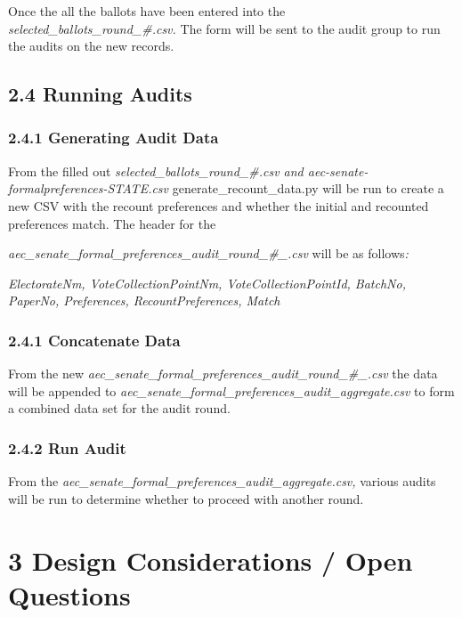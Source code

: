 \documentclass[]{article}
\begin{document}
Once the all the ballots have been entered into the
\emph{selected\_ballots\_round\_\#.csv.} The form will be sent to the
audit group to run the audits on the new records.

\subsection{2.4 Running Audits}\label{running-audits}

\subsubsection{2.4.1 Generating Audit Data}\label{generating-audit-data}

From the filled out \emph{selected\_ballots\_round\_\#.csv and
aec-senate-formalpreferences-STATE.csv} generate\_recount\_data.py will
be run to create a new CSV with the recount preferences and whether the
initial and recounted preferences match. The header for the

\emph{aec\_senate\_formal\_preferences\_audit\_round\_\#\_.csv} will be
as follows\emph{:}

\emph{ElectorateNm, VoteCollectionPointNm, VoteCollectionPointId,
BatchNo, PaperNo, Preferences, RecountPreferences, Match}

\subsubsection{2.4.1 Concatenate Data}\label{concatenate-data}

From the new
\emph{aec\_senate\_formal\_preferences\_audit\_round\_\#\_.csv} the data
will be appended to
\emph{aec\_senate\_formal\_preferences\_audit\_aggregate.csv} to form a
combined data set for the audit round.

\subsubsection{2.4.2 Run Audit}\label{run-audit}

From the \emph{aec\_senate\_formal\_preferences\_audit\_aggregate.csv,}
various audits will be run to determine whether to proceed with another
round.

\section{3 Design Considerations / Open
Questions}\label{design-considerations-open-questions}
\end{document}
